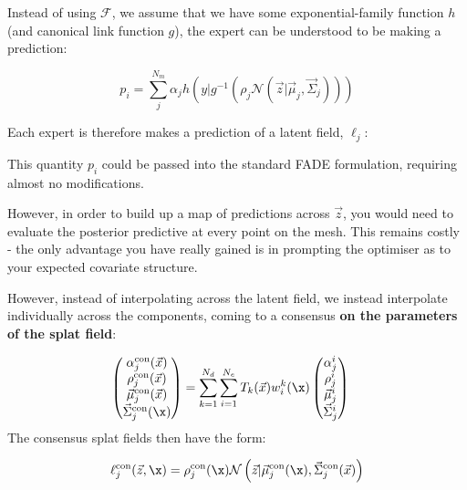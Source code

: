         Instead of using $\mathcal{F}$, we assume that we have some exponential-family function $h$ (and canonical link function $g$), the expert can be understood to be making a prediction:

        \begin{equation}
            p_i = \sum_j^{N_m} \alpha_j h\left(y | g^{-1}(\rho_j \mathcal{N}(\vec{z} | \vec{\mu}_j, \vec{\Sigma}_j)) \right)
        \end{equation}

        Each expert is therefore makes a prediction of a latent field, $\ell_j$:
       
        \begin{aside}
            This quantity $p_i$ could be passed into the standard FADE formulation, requiring almost no modifications. 

            However, in order to build up a map of predictions across $\vec{z}$, you would need to evaluate the posterior predictive at every point on the mesh. This remains costly - the only advantage you have really gained is in prompting the optimiser as to your expected covariate structure. 
        \end{aside}
        However, instead of interpolating across the latent field, we instead interpolate individually across the components, coming to a consensus \textbf{on the parameters of the splat field}:


        
        \begin{align}
            \begin{pmatrix}\alpha_j^\text{con}(\vec{x}) \\ \rho_j^\text{con}(\vec{x})\\ \vec{\mu}_j^\text{con}(\vec{x}) \\ \vec{\Sigma}_j^\text{con}(\x)\end{pmatrix} 
            & = 
            \sum_{k=1}^{N_d}\sum_{i=1}^{N_e} T_k(\vec{x}) w_i^k(\x)   \begin{pmatrix}\alpha_j^i\\ \rho_j^i \\\vec{\mu}_j^i\\ \vec{\Sigma}_j^i\end{pmatrix}
        \end{align}
        The consensus splat fields then have the form:
        
        \begin{equation}
            \ell^\text{con}_j(\vec{z},\x) = \rho_j^\text{con}(\x)\mathcal{N}\left(\vec{z} | \vec{\mu}^\text{con}_j(\x), \vec{\Sigma}^\text{con}_j(\vec{x}) \right)
        \end{equation}
        
